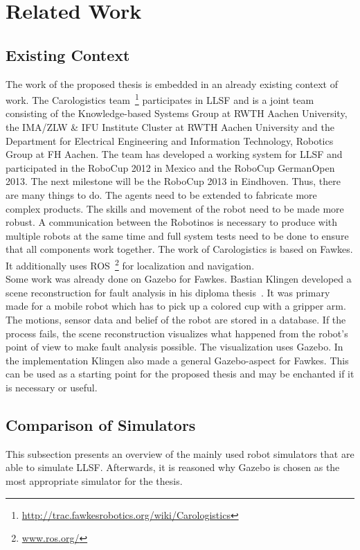\documentclass[a4paper,11pt]{article}
\begin{document}
\section{Related Work}
\subsection{Existing Context}
The work of the proposed thesis is embedded in an already existing context of work. The Carologistics team~\footnote{\url{http://trac.fawkesrobotics.org/wiki/Carologistics}} participates in LLSF and is a joint team consisting of the Knowledge-based Systems Group at RWTH Aachen University, the IMA/ZLW \& IFU Institute Cluster at RWTH Aachen University and the Department for Electrical Engineering and Information Technology, Robotics Group at FH Aachen. The team has developed a working system for LLSF and participated in the RoboCup 2012 in Mexico and the RoboCup GermanOpen 2013. The next milestone will be the RoboCup 2013 in Eindhoven. Thus, there are many things to do. The agents need to be extended to fabricate more complex products. The skills and movement of the robot need to be made more robust. A communication between the Robotinos is necessary to produce with multiple robots at the same time and full system tests need to be done to ensure that all components work together. The work of Carologistics is based on Fawkes. It additionally uses ROS~\footnote{\url{www.ros.org/}} for localization and navigation.\\
Some work was already done on Gazebo for Fawkes. Bastian Klingen developed a scene reconstruction for fault analysis in his diploma thesis~\cite{KlingenDA}. It was primary made for a mobile robot which has to pick up a colored cup with a gripper arm. The motions, sensor data and belief of the robot are stored in a database. If the process fails, the scene reconstruction visualizes what happened from the robot's point of view to make fault analysis possible. The visualization uses Gazebo. In the implementation Klingen also made a general Gazebo-aspect for Fawkes. This can be used as a starting point for the proposed thesis and may be enchanted if it is necessary or useful.
\subsection{Comparison of Simulators}
This subsection presents an overview of the mainly used robot simulators that are able to simulate LLSF. Afterwards, it is reasoned why Gazebo is chosen as the most appropriate simulator for the thesis.
\end{document}
